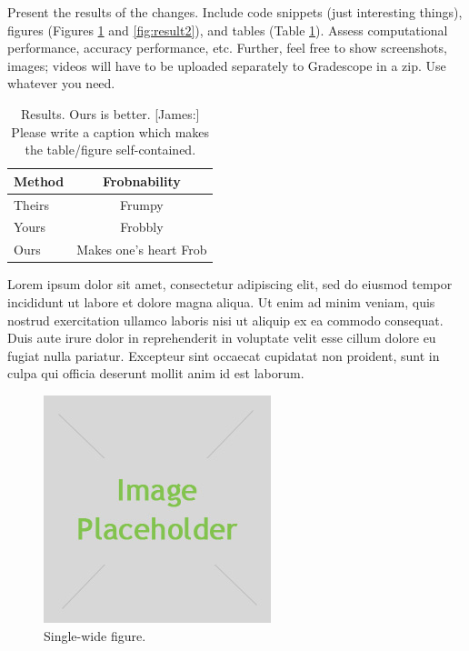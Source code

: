 \documentclass[10pt,twocolumn,letterpaper]{article}
\begin{document}
Present the results of the changes. Include code snippets (just interesting things), figures (Figures \ref{fig:result1} and \ref{fig:result2}), and tables (Table \ref{tab:example}). Assess computational performance, accuracy performance, etc. Further, feel free to show screenshots, images; videos will have to be uploaded separately to Gradescope in a zip. Use whatever you need.

\begin{table}
\begin{center}
\begin{tabular}{ l c }
\toprule
Method & Frobnability \\
\midrule
Theirs & Frumpy \\
Yours & Frobbly \\
Ours & Makes one's heart Frob\\
\bottomrule
\end{tabular}
\end{center}
\caption{Results. Ours is better. [James:] Please write a caption which makes the table/figure self-contained.}
\label{tab:example}
\end{table}

Lorem ipsum dolor sit amet, consectetur adipiscing elit, sed do eiusmod tempor incididunt ut labore et dolore magna aliqua. Ut enim ad minim veniam, quis nostrud exercitation ullamco laboris nisi ut aliquip ex ea commodo consequat. Duis aute irure dolor in reprehenderit in voluptate velit esse cillum dolore eu fugiat nulla pariatur. Excepteur sint occaecat cupidatat non proident, sunt in culpa qui officia deserunt mollit anim id est laborum.

\begin{figure}[t]
    \centering
    \includegraphics[width=\linewidth]{placeholder.jpg}
    \caption{Single-wide figure.}
    \label{fig:result1}
\end{figure}
\end{document}
